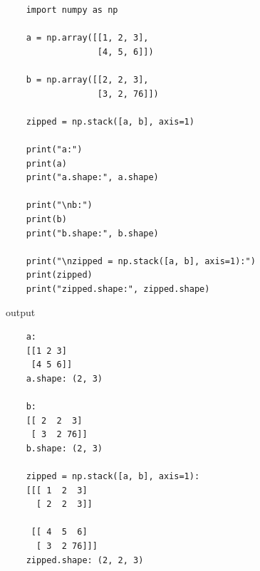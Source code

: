 \begin{verbatim}
    import numpy as np

    a = np.array([[1, 2, 3],
                  [4, 5, 6]])
    
    b = np.array([[2, 2, 3],
                  [3, 2, 76]])
    
    zipped = np.stack([a, b], axis=1)
    
    print("a:")
    print(a)
    print("a.shape:", a.shape)
    
    print("\nb:")
    print(b)
    print("b.shape:", b.shape)
    
    print("\nzipped = np.stack([a, b], axis=1):")
    print(zipped)
    print("zipped.shape:", zipped.shape)
\end{verbatim}

output

\begin{verbatim}
    a:
    [[1 2 3]
     [4 5 6]]
    a.shape: (2, 3)
    
    b:
    [[ 2  2  3]
     [ 3  2 76]]
    b.shape: (2, 3)
    
    zipped = np.stack([a, b], axis=1):
    [[[ 1  2  3]
      [ 2  2  3]]
    
     [[ 4  5  6]
      [ 3  2 76]]]
    zipped.shape: (2, 2, 3)
\end{verbatim}